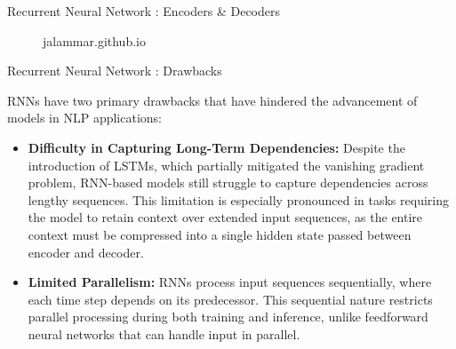 \documentclass[10pt]{beamer}
\begin{document}
\begin{frame}[fragile]{Recurrent Neural Network : Encoders \& Decoders}

	\begin{figure}[h]
		\centering
	\end{figure}

	\begin{figure}[h]
		\centering
		\caption{jalammar.github.io}
	\end{figure}

\end{frame}

\begin{frame}[fragile]{Recurrent Neural Network : Drawbacks}

	RNNs have two primary drawbacks that have hindered the advancement of models in NLP applications:

	\begin{itemize}

		\item \textbf{Difficulty in Capturing Long-Term Dependencies:} Despite the introduction of LSTMs, which
		      partially mitigated the vanishing gradient problem, RNN-based models still struggle to capture dependencies
		      across lengthy sequences. This limitation is especially pronounced in tasks requiring the model to retain
		      context over extended input sequences, as the entire context must be compressed into a single hidden state
		      passed between encoder and decoder.

		\item \textbf{Limited Parallelism:} RNNs process input sequences sequentially, where each time step depends on
		      its predecessor. This sequential nature restricts parallel processing during both training and inference,
		      unlike feedforward neural networks that can handle input in parallel.

	\end{itemize}

\end{frame}
\end{document}

